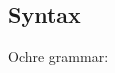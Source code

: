 \documentclass[12pt,twoside]{report}
\begin{document}







\FloatBarrier
\subsection{Syntax}
\FloatBarrier
Ochre grammar:
\end{document}
